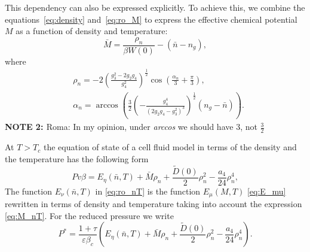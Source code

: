 \documentclass[12pt]{article}
\begin{document}
	This dependency can also be expressed explicitly. To achieve this, we combine the equations~\eqref{eq:density} and~\eqref{eq:ro_M} to express the effective chemical potential $M$ as a function of density and temperature:
	\begin{equation}\label{eq:M_nT}
		\bar M = \frac{\rho_{n}}{\beta W(0)} - (\bar n - n_g),
	\end{equation}
	where
	\begin{align} \label{eq:ro_nT}
		 & \rho_{n} = - 2 \left(\frac{g_3^2 - 2g_2 g_4}{g_4^2} \right)^{\frac{1}{2}} \cos \left( \frac{\alpha_n}{3} + \frac{\pi}{3} \right), \\
		 & \alpha_n = \arccos \left( \frac{3}{2} \left( - \frac{g_4^4}{\left( 2 g_2 g_4 - g_3^2\right)^3}\right)^{\frac{1}{2}} (n_g - \bar n)\right). \nonumber
	\end{align}
	{\color{Red} {\bf{NOTE 2: }} Roma: In my opinion, under {\it{arccos}} we should have 3, not $\frac{3}{2}$}
	
	At $T>T_c$ the equation of state of a cell fluid model in terms of the density and the temperature has the following form
	\begin{equation}\label{eq:eosNT}
	Pv\beta = E_\eta (\bar n,T) + \bar M \rho_{n} + \frac{\tilde D(0)}{2} \rho_{n}^2 - \frac{a_4}{24} \rho_{n}^4,
	\end{equation}
 The function $E_\nu (\bar n, T)$ in \eqref{eq:ro_nT} is the function $E_\mu (M,T)$ \eqref{eq:E_mu} rewritten in terms of density and temperature taking into account the expression \eqref{eq:M_nT}. For the reduced pressure we write
 \begin{equation}
 	\label{eq:eosPTn_reduced}
 	P^* = \frac{1 + \tau}{\varepsilon \beta_c} \left(E_\eta (\bar n,T) + \bar M \rho_{n} + \frac{\tilde D(0)}{2} \rho_{n}^2 - \frac{a_4}{24} \rho_{n}^4\right).
 \end{equation}
	
\end{document}
